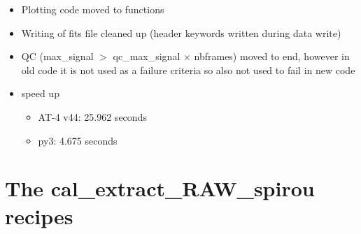\begin{itemize}
\item Plotting code moved to \spirouPlot functions

\item Writing of fits file cleaned up (header keywords written during data write)

\item QC (max\_signal $>$ qc\_max\_signal $\times$ nbframes) moved to end, however in old code it is not used as a failure criteria so also not used to fail in new code

\item speed up
	\begin{itemize}
	\item AT-4 v44: 25.962 seconds
	\item py3: 4.675 seconds
    \end{itemize}

\end{itemize}

\section{The cal\_extract\_RAW\_spirou recipes}
\label{ch:changelog:At4:cal_extract_RAW_spirou}

